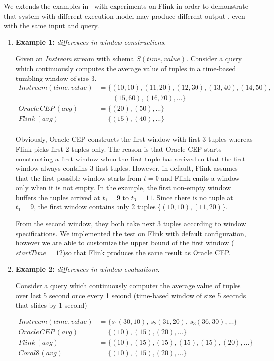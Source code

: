 We extends the examples in~ \citep{Dindar:2013} with experiments on Flink in order to demonstrate that system with different execution model may produce different output , even with the same input and query. 
\begin{enumerate}

\item \textbf{Example 1:} \textit{differences in window constructions}.

Given an \textit{Instream} stream with schema $S(time, value)$. Consider a query which continuously computes the average value of tuples in a time-based tumbling window of size 3.
\begin{align*}
Instream(time,value) &= \{(10,10),(11,20),(12,30),(13,40),(14,50),\\
&\qquad (15,60),(16,70),...\} \\
Oracle\, CEP\, (avg)		&= \{(20), (50),...\} \\
Flink\, (avg)			&= \{(15), (40),...\} \\
\end{align*}

Obviously, Oracle CEP constructs the first window with first 3 tuples whereas Flink picks first 2 tuples only. The reason is that Oracle CEP starts constructing a first window when the first tuple has arrived so that the first window always contains 3 first tuples. However, in default, Flink assumes that the first possible window starts from $t = 0$ and Flink emits a window only when it is not empty. In the example, the first non-empty window buffers the tuples arrived at $t_1=9$ to $t_3=11$. Since there is no tuple at $t_1 = 9$, the first window contains only 2 tuples $\{(10,10),(11,20)\}$.

From the second window, they both take next 3 tuples according to window specifications. We implemented the test on Flink with default configuration, however we are able to customize the upper bound of the first window ($startTime = 12$)so that Flink produces the same result as Oracle CEP.


\item \textbf{Example 2:} \textit{differences in window evaluations}.

Consider a query which continuously computer the average value of tuples over last 5 second once every 1 second (time-based window of size 5 seconds that slides by 1 second)

\begin{align*}
Instream(time,value) 	&= \{s_1(30,10),\,s_2(31,20),\,s_3(36,30),...\} \\
Oracle\, CEP\, (avg)		&= \{(10), (15),(20),...\} \\
Flink\, (avg)			&= \{(10), (15), (15), (15), (15), (20),...\}\\
Coral8\, (avg)			&= \{(10), (15),(20),...\}			
\end{align*}


\end{enumerate}
